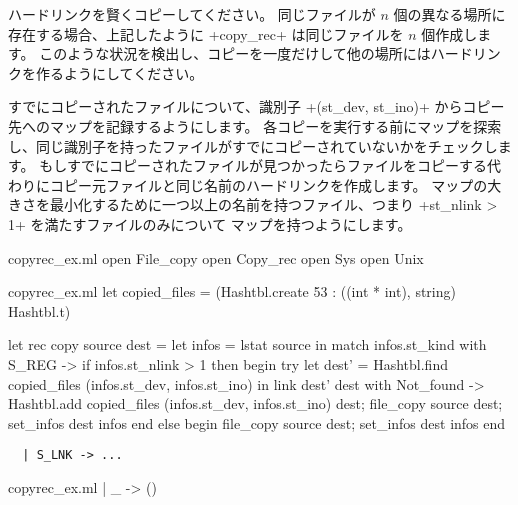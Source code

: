 \begin{exercise}
\label{ex/copyrec}
ハードリンクを賢くコピーしてください。
同じファイルが $n$ 個の異なる場所に存在する場合、上記したように \ml+copy_rec+ は同じファイルを $n$ 個作成します。
このような状況を検出し、コピーを一度だけして他の場所にはハードリンクを作るようにしてください。
\end{exercise}

\begin{answer}
すでにコピーされたファイルについて、識別子 \ml+(st_dev, st_ino)+ からコピー先へのマップを記録するようにします。
各コピーを実行する前にマップを探索し、同じ識別子を持ったファイルがすでにコピーされていないかをチェックします。
もしすでにコピーされたファイルが見つかったらファイルをコピーする代わりにコピー元ファイルと同じ名前のハードリンクを作成します。
マップの大きさを最小化するために一つ以上の名前を持つファイル、つまり \ml+st_nlink > 1+ を満たすファイルのみについて
マップを持つようにします。
%
\begin{codefile}{copyrec_ex.ml}
open File_copy
open Copy_rec
open Sys
open Unix
\end{codefile}
%
\begin{listingcodefile}{copyrec_ex.ml}
let copied_files = (Hashtbl.create 53 : ((int * int), string) Hashtbl.t)

let rec copy source dest =
  let infos = lstat source in
  match infos.st_kind with
    S_REG ->
      if infos.st_nlink > 1 then begin
        try
          let dest' =
            Hashtbl.find copied_files (infos.st_dev, infos.st_ino)
          in link dest' dest
        with Not_found ->
          Hashtbl.add copied_files (infos.st_dev, infos.st_ino) dest;
          file_copy source dest;
          set_infos dest infos
      end else begin
        file_copy source dest;
        set_infos dest infos
      end
\end{listingcodefile}
\begin{lstlisting}
  | S_LNK -> ...
\end{lstlisting}
\begin{codefile}{copyrec_ex.ml}
| _ -> ()
\end{codefile}
\end{answer}

